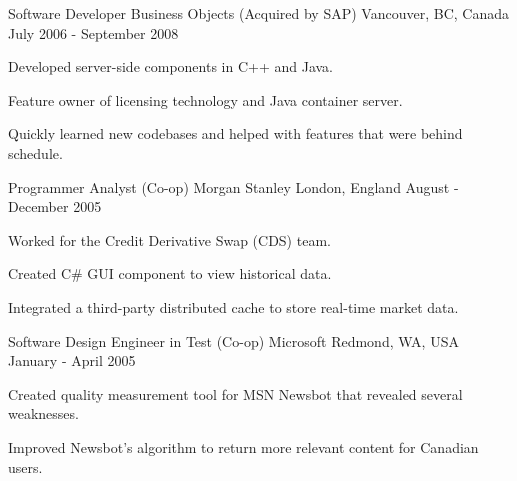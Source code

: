 \begin{cventries}
  \cventry
    {Software Developer} %
    {Business Objects (Acquired by SAP)} %
    {Vancouver, BC, Canada} %
    {July 2006 - September 2008} %
    {
      \begin{cvitems} %
        \item {Developed server-side components in C++ and Java.}
        \item {Feature owner of licensing technology and Java container server.}
        \item {Quickly learned new codebases and helped with features that were behind schedule.}
      \end{cvitems}
    }

  \cventry
    {Programmer Analyst (Co-op)} %
    {Morgan Stanley} %
    {London, England} %
    {August - December 2005} %
    {
      \begin{cvitems} %
        \item {Worked for the Credit Derivative Swap (CDS) team.}
        \item {Created C\# GUI component to view historical data.}
        \item {Integrated a third-party distributed cache to store real-time market data.}
      \end{cvitems}
    }

  \cventry
    {Software Design Engineer in Test (Co-op)} %
    {Microsoft} %
    {Redmond, WA, USA} %
    {January - April 2005} %
    {
      \begin{cvitems} %
        \item {Created quality measurement tool for MSN Newsbot that revealed several weaknesses.}
        \item {Improved Newsbot’s algorithm to return more relevant content for Canadian users.}
      \end{cvitems}
    }

\end{cventries}
